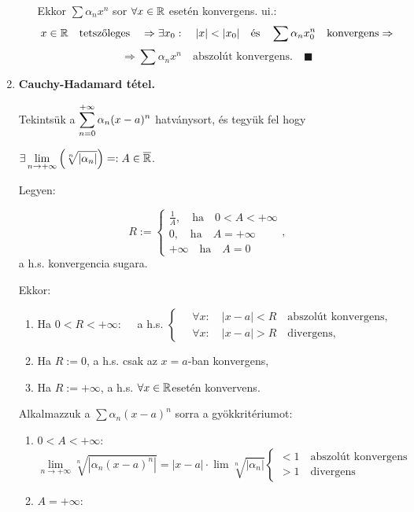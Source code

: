 \documentclass[a4paper,11.5pt]{article}
\begin{document}
\begin{enumerate}
\begin{enumerate}
			Ekkor $\sum\alpha_nx^n$ sor $\forall x \in \mathbb{R}$ esetén konvergens. ui.:
			\[ x\in \R \quad \text{tetszőleges}\quad \Rightarrow \exists x_0: \quad |x|<|x_0|\quad \text{és}\quad \sum\alpha_nx^n_0 \quad \text{konvergens}\Rightarrow\]\[ \Rightarrow\sum\alpha_nx^n\quad \text{abszolút konvergens.} \quad \blacksquare\]
		\end{enumerate}
		
		\item \textbf{Cauchy-Hadamard tétel.}
		
		Tekintsük a $\displaystyle\sum_{n=0}^{+\infty} \alpha_n(x-a)^n$ hatványsort, és tegyük fel hogy
		
		$\displaystyle\exists\lim_{n\to+\infty}\left(\sqrt[n]{|\alpha_n|}\right)=:A\in\overline{\mathbb{R}}$.
		 
		 Legyen:
		 
		 \[ R:=\left\{
		 \begin{gathered}
			 \frac{1}{A}, \quad \text{ha}\quad 0<A<+\infty\\
			 0, \quad \text{ha}\quad A=+\infty\\
			 +\infty \quad \text{ha}\quad A=0
		 \end{gathered}\right., \]
		 a h.s. konvergencia sugara.
		 
		 Ekkor:\begin{enumerate}
			\item Ha $ 0<R<+\infty:\quad$ a h.s.
			$\left\{\begin{gathered}
				\quad\forall x: \quad |x-a|<R \quad \text{abszolút konvergens,}\\
				\quad\forall x: \quad |x-a|>R \quad \text{divergens,}
			\end{gathered}\right. $
			\item Ha $R:=0$, a h.s. csak az $x=a$-ban konvergens,
			\item Ha $R:=+\infty$, a h.s. $\forall x \in \mathbb{R}$\quad esetén konvervens.
		\end{enumerate}
		
		\biz Alkalmazzuk a $\sum\alpha_n(x-a)^n$ sorra a gyökkritériumot:
		\begin{enumerate}
			\item $0<A<+\infty$:
			\[\lim_{n\to+\infty}\sqrt[n]{|\alpha_n(x-a)^n|}=|x-a|\cdot\lim\sqrt[n]{|\alpha_n|}
			\left\{\begin{gathered}
				<1\quad \text{abszolút konvergens}\\
				>1\quad \text{divergens}
			\end{gathered}\right.\]
			\item $A=+\infty$:
			

\end{enumerate}
\end{enumerate}
\end{document}
